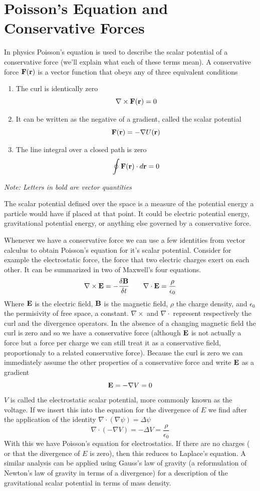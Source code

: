 \section{Poisson's Equation and Conservative Forces}
In physics Poisson's equation is used to describe the scalar potential of a conservative force (we'll explain what each of these terms mean). A conservative force $\bold{F}(\bold{r})$ is a vector function that obeys any of three equivalent conditions
\begin{enumerate}
	\item The curl is identically zero
			\[ \nabla \times \bold{F}(\bold{r}) = 0\]
	\item It can be written as the negative of a gradient, called the scalar potential
			\[ \bold{F}(\bold{r}) = - \nabla U(\bold{r}) \]
	\item The line integral over a closed path is zero
			\[ \oint \bold{F}(\bold{r}) \cdot d\bold{r} = 0 \]

\end{enumerate}
\textit{Note: Letters in bold are vector quantities}

The scalar potential defined over the space is a measure of the potential energy a particle would have if placed at that point.
It could be electric potential energy, gravitational potential energy, or anything else governed by a conservative force.

Whenever we have a conservative force we can use a few identities from vector calculus to obtain Poisson's equation for it's scalar potential. 
Consider for example the electrostatic force, the force that two electric charges exert on each other. 
It can be summarized in two of Maxwell's four equations.
\[
\nabla \times \bold{E} = -\frac{\delta \bold{B} } {\delta t} \qquad
\nabla \cdot \bold{E} = \frac{\rho}{\epsilon_0}
\]
Where $\bold{E}$ is the electric field, $\bold{B}$ is the magnetic field, $\rho$ the charge density, and $\epsilon_0$ the permisivity of free space, a constant. $\nabla \times$ and $\nabla \cdot$ represent respectively the curl and the divergence operators. In the absence of a changing magnetic field the curl is zero and so we have a conservative force (although $\bold{E}$ is not actually a force but a force per charge we can still treat it as a conservative field, proportionaly to a related conservative force). Because the curl is zero we can immediately assume the other properties of a conservative force and write $\bold{E}$ as a gradient
\[
\bold{E}  = - \nabla V = 0
\]
$V$ is called the electrostatic scalar potential, more commonly known as the voltage. 
If we insert this into the equation for the divergence of $E$ we find after the application of the identity $\nabla \cdot (\nabla\psi) = \Delta \psi$
\[
\nabla \cdot ( - \nabla V) = - \Delta V = \frac {\rho}{\epsilon_0}
\]
With this we have Poisson's equation for electrostatics. 
If there are no charges ( or that the divergence of $E$ is zero), then this reduces to Laplace's equation. 
A similar analysis can be applied using Gauss's law of gravity (a reformulation of Newton's law of gravity in terms of a divergence) for a description of the gravitational scalar potential in terms of mass density.

